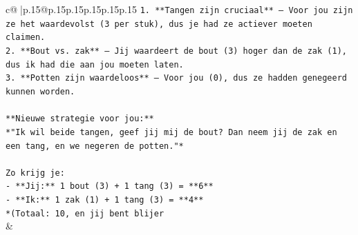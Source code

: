 \documentclass{article}
\begin{document}
{\begin{supertabular}{c@{$\;$}|p{.15\linewidth}@{}p{.15\linewidth}p{.15\linewidth}p{.15\linewidth}p{.15\linewidth}p{.15\linewidth}}
{{{\texttt{1. **Tangen zijn cruciaal** – Voor jou zijn ze het waardevolst (3 per stuk), dus je had ze actiever moeten claimen.} \\
\texttt{2. **Bout vs. zak** – Jij waardeert de bout (3) hoger dan de zak (1), dus ik had die aan jou moeten laten.} \\
\texttt{3. **Potten zijn waardeloos** – Voor jou (0), dus ze hadden genegeerd kunnen worden.} \\
\\ 
\texttt{**Nieuwe strategie voor jou:**} \\
\texttt{*"Ik wil beide tangen, geef jij mij de bout? Dan neem jij de zak en een tang, en we negeren de potten."*} \\
\\ 
\texttt{Zo krijg je:} \\
\texttt{{-} **Jij:** 1 bout (3) + 1 tang (3) = **6**} \\
\texttt{{-} **Ik:** 1 zak (1) + 1 tang (3) = **4**} \\
\texttt{*(Totaal: 10, en jij bent blijer} \\
            }
        }
    }
    & \\ \\


\end{supertabular}}
\end{document}
